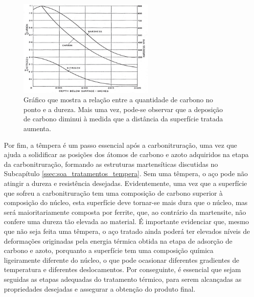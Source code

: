 \begin{figure}[htb]
    \centering
    \includegraphics[width = 0.6\textwidth]{Figures/Cap2/Carbon_Hardness_Carbonitriding.png}
    \caption[Relação entre carbono, azoto e dureza]%
    {Gráfico que mostra a relação entre a quantidade de carbono no ponto e a dureza\cite{Herring2011}. Mais uma vez, pode-se observar que a deposição de carbono diminui à medida que a distância da superfície tratada aumenta.}
    \label{fig:Carbon_Hardness_Carbonitriding}
\end{figure}
\par
Por fim, a têmpera é um passo essencial após a carbonitruração, uma vez que ajuda a solidificar as posições dos átomos de carbono e azoto adquiridos na etapa da carbonitruração, formando as estruturas martensíticas discutidas no Subcapítulo \ref{ssec:soa_tratamentos_tempera}. Sem uma têmpera, o aço pode não atingir a dureza e resistência desejadas. Evidentemente, uma vez que a superfície que sofreu a carbonitruração tem uma composição de carbono superior à composição do núcleo, esta superfície deve tornar-se mais dura que o núcleo, mas será maioritariamente composta por ferrite, que, ao contrário da martensite, não confere uma dureza tão elevada ao material. É importante evidenciar que, mesmo que não seja feita uma têmpera, o aço tratado ainda poderá ter elevados níveis de deformações originadas pela energia térmica obtida na etapa de adsorção de carbono e azoto, porquanto a superfície tem uma composição química ligeiramente diferente do núcleo, o que pode ocasionar diferentes gradientes de temperatura e diferentes deslocamentos. Por conseguinte, é essencial que sejam seguidas as etapas adequadas do tratamento térmico, para serem alcançadas as propriedades desejadas e assegurar a obtenção do produto final.

